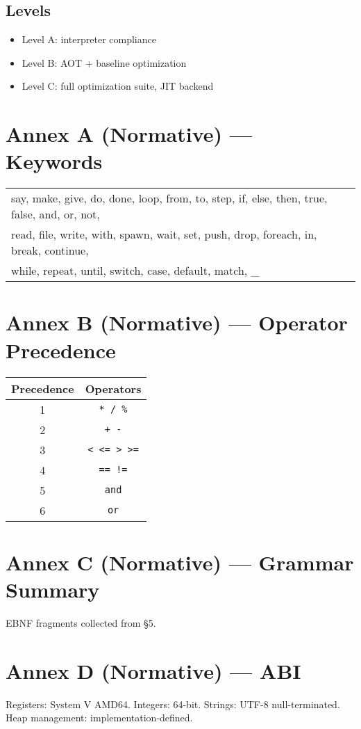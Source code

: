 \documentclass[12pt,a4paper]{article}
\begin{document}
\subsection{Levels}
\begin{itemize}
\item Level A: interpreter compliance
\item Level B: AOT + baseline optimization
\item Level C: full optimization suite, JIT backend
\end{itemize}

\appendix

\section{Annex A (Normative) --- Keywords}
\begin{longtable}{|l|}
\hline
say, make, give, do, done, loop, from, to, step, if, else, then, true, false, and, or, not, \\
read, file, write, with, spawn, wait, set, push, drop, foreach, in, break, continue, \\
while, repeat, until, switch, case, default, match, \_ \\
\hline
\end{longtable}

\section{Annex B (Normative) --- Operator Precedence}
\begin{longtable}{|c|c|}
\hline
Precedence & Operators \\
\hline
1 & \texttt{* / \%} \\
2 & \texttt{+ -} \\
3 & \texttt{< <= > >=} \\
4 & \texttt{== !=} \\
5 & \texttt{and} \\
6 & \texttt{or} \\
\hline
\end{longtable}

\section{Annex C (Normative) --- Grammar Summary}
EBNF fragments collected from §5.

\section{Annex D (Normative) --- ABI}
Registers: System V AMD64.  
Integers: 64-bit.  
Strings: UTF-8 null-terminated.  
Heap management: implementation-defined.
\end{document}
